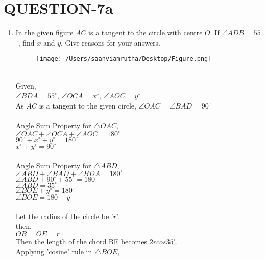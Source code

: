 \documentclass[journal,12pt,twocolumn]{IEEEtran}
\renewcommand\thesection{\arabic{section}}
\begin{document}
\section{\textbf{QUESTION-7a}}
\begin{enumerate}[label=\thesection.\arabic*.,ref=\thesection.\theenumi]
\item In the given figure $AC$ is a tangent to the circle with centre $O$. If $\angle$$ADB=55$$^{\circ}$, find $x$ and $y$. Give reasons for your answers.\\
\begin{figure}[htbp]
\texttt{[image: /Users/saanviamrutha/Desktop/Figure.png]}
\label{fig}
\end{figure}

\solution \\
Given,\\
 $\angle BDA=55^\circ$, $\angle OCA=x^\circ$, $\angle AOC=y^\circ$\\
As $AC$ is a tangent to the given circle, $\angle OAC=\angle BAD=90^\circ$\\
\\
Angle Sum Property for $\triangle OAC$, \\
              $\angle OAC+\angle OCA+\angle AOC=180^\circ$ \\
               $90^\circ+x^\circ+y^\circ=180^\circ$\\
               $x^\circ+y^\circ=90^\circ$\\ \\
               
Angle Sum Property for $\triangle ABD$, \\   
               $\angle ABD+\angle BAD+\angle BDA=180^\circ$\\
               $\angle ABD+90^\circ+55^\circ=180^\circ$\\
               $\angle ABD=35^\circ$\\ 
                
                $\angle BOE+y^\circ=180^\circ$\\
                $\angle BOE=180-y$\\ \\
                Let the radius of the circle be '$r$'.\\
                then,\\
                $OB=OE=r$\\
                Then the length of the chord BE becomes $2rcos 35^\circ$.\\
                Applying 'cosine' rule in $\triangle BOE$,\\ 
              

\end{enumerate}
\end{document}
